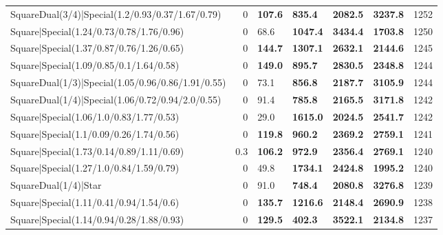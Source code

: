 \begin{tabular}{lrllllr}
 SquareDual(3/4)|Special(1.2/0.93/0.37/1.67/0.79)              &             0   & \textbf{107.6} & \textbf{835.4}  & \textbf{2082.5} & \textbf{3237.8} &         1252 \\
 Square|Special(1.24/0.73/0.78/1.76/0.96)                      &             0   & 68.6           & \textbf{1047.4} & \textbf{3434.4} & \textbf{1703.8} &         1250 \\
 Square|Special(1.37/0.87/0.76/1.26/0.65)                      &             0   & \textbf{144.7} & \textbf{1307.1} & \textbf{2632.1} & \textbf{2144.6} &         1245 \\
 Square|Special(1.09/0.85/0.1/1.64/0.58)                       &             0   & \textbf{149.0} & \textbf{895.7}  & \textbf{2830.5} & \textbf{2348.8} &         1244 \\
 SquareDual(1/3)|Special(1.05/0.96/0.86/1.91/0.55)             &             0   & 73.1           & \textbf{856.8}  & \textbf{2187.7} & \textbf{3105.9} &         1244 \\
 SquareDual(1/4)|Special(1.06/0.72/0.94/2.0/0.55)              &             0   & 91.4           & \textbf{785.8}  & \textbf{2165.5} & \textbf{3171.8} &         1242 \\
 Square|Special(1.06/1.0/0.83/1.77/0.53)                       &             0   & 29.0           & \textbf{1615.0} & \textbf{2024.5} & \textbf{2541.7} &         1242 \\
 Square|Special(1.1/0.09/0.26/1.74/0.56)                       &             0   & \textbf{119.8} & \textbf{960.2}  & \textbf{2369.2} & \textbf{2759.1} &         1241 \\
 Square|Special(1.73/0.14/0.89/1.11/0.69)                      &             0.3 & \textbf{106.2} & \textbf{972.9}  & \textbf{2356.4} & \textbf{2769.1} &         1240 \\
 Square|Special(1.27/1.0/0.84/1.59/0.79)                       &             0   & 49.8           & \textbf{1734.1} & \textbf{2424.8} & \textbf{1995.2} &         1240 \\
 SquareDual(1/4)|Star                                          &             0   & 91.0           & \textbf{748.4}  & \textbf{2080.8} & \textbf{3276.8} &         1239 \\
 Square|Special(1.11/0.41/0.94/1.54/0.6)                       &             0   & \textbf{135.7} & \textbf{1216.6} & \textbf{2148.4} & \textbf{2690.9} &         1238 \\
 Square|Special(1.14/0.94/0.28/1.88/0.93)                      &             0   & \textbf{129.5} & \textbf{402.3}  & \textbf{3522.1} & \textbf{2134.8} &         1237 \\

\end{tabular}
